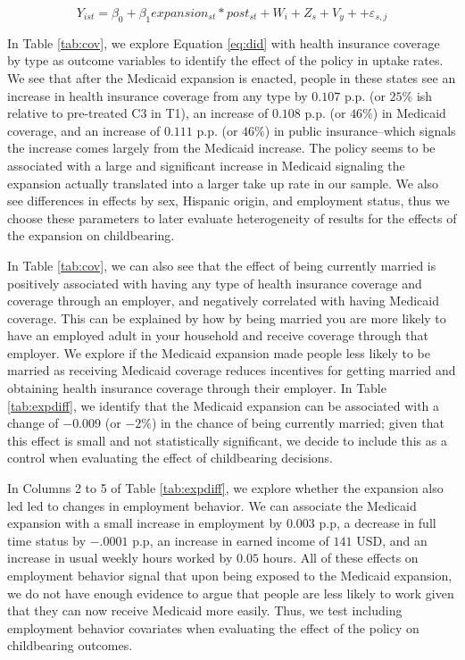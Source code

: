 \documentclass{article}
\begin{document}
\begin{equation}
    \label{eq:did}
    Y_{ist} = \beta_0 + \beta_1 expansion_{st}*post_{st} +  W_{i} + Z_{s} + V_{y}+ + \varepsilon_{s,j}
\end{equation}

In Table \ref{tab:cov}, we explore Equation \ref{eq:did} with health insurance coverage by type as outcome variables to identify the effect of the policy in uptake rates. We see that after the Medicaid expansion is enacted, people in these states see an increase in health insurance coverage from any type by $0.107$ p.p. (or $25\%$ ish relative to pre-treated  C3 in T1), an increase of $0.108$ p.p. (or $46\%$) in Medicaid coverage, and an increase of $0.111$ p.p. (or $46\%$) in public insurance--which signals the increase comes largely from the Medicaid increase. The policy seems to be associated with a large and significant increase in Medicaid signaling the expansion actually translated into a larger take up rate in our sample. We also see differences in effects by sex, Hispanic origin, and employment status, thus we choose these parameters to later evaluate heterogeneity of results for the effects of the expansion on childbearing. 

In Table \ref{tab:cov}, we can also see that the effect of being currently married is positively associated with having any type of health insurance coverage and coverage through an employer, and negatively correlated with having Medicaid coverage. This can be explained by how by being married you are more likely to have an employed adult in your household and receive coverage through that employer. We explore if the Medicaid expansion made people less likely to be married as receiving Medicaid coverage reduces incentives for getting married and obtaining health insurance coverage through their employer. In Table \ref{tab:expdiff}, we identify that the Medicaid expansion can be associated with a change of $-0.009$ (or $-2\%$) in the chance of being currently married; given that this effect is small and not statistically significant, we decide to include this as a control when evaluating the effect of childbearing decisions. 

In Columns 2 to 5 of Table \ref{tab:expdiff}, we explore whether the expansion also led led to changes in employment behavior. We can associate the Medicaid expansion with a small increase in employment by $0.003$ p.p, a decrease in full time status by $-.0001$ p.p, an increase in earned income of $141$ USD, and an increase in usual weekly hours worked by $0.05$ hours. All of these effects on employment behavior signal that upon being exposed to the Medicaid expansion, we do not have enough evidence to argue that people are less likely to work given that they can now receive Medicaid more easily. Thus, we test including employment behavior covariates when evaluating the effect of the policy on childbearing outcomes.
\end{document}
